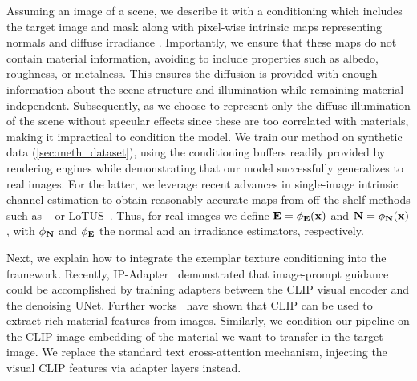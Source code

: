 Assuming an image \target of a scene, we describe it with a conditioning \xx which includes the target image and mask along with pixel-wise intrinsic maps representing normals \normal %
and diffuse irradiance \irra%
. Importantly, we ensure that these maps do not contain material information, avoiding to include properties such as albedo, roughness, or metalness. This ensures the diffusion is provided with enough information about the scene structure and illumination while remaining material-independent. Subsequently, as \irra we choose to represent only the diffuse illumination of the scene without specular effects since these are too correlated with materials, making it impractical to condition the model. 
We train our method on synthetic data (\cref{sec:meth_dataset}), using the conditioning buffers readily provided by rendering engines while demonstrating that our model successfully generalizes to real images. 
For the latter, we leverage recent advances in single-image intrinsic channel estimation to obtain reasonably accurate maps from off-the-shelf methods such as \rgbtooxx~\cite{zeng2024rgbx} or LoTUS~\cite{he2024lotus}. Thus, for real images we define $\mathbf{E}=\phi_\mathbf{E}(\mathbf{x})$ and $ \mathbf{N}=\phi_\mathbf{N}(\mathbf{x})$, with $\phi_\mathbf{N}$ and $\phi_\mathbf{E}$ the normal and an irradiance estimators, respectively.

Next, we explain how to integrate the exemplar texture conditioning into the framework. 
Recently, IP-Adapter~\cite{ye2023ipadapter} demonstrated that image-prompt guidance could be accomplished by training adapters between the CLIP \cite{radford2021learning} visual encoder and the denoising UNet. Further works~\cite{vecchio2024controlmat,cheng2024zest,Yan:2023:PSDR-Room,guerrero2024texsliders} have shown that CLIP can be used to extract rich material features from images. 
Similarly, we condition our pipeline on the CLIP image embedding of the material we want to transfer in the target image. We replace the standard text cross-attention mechanism, injecting the visual CLIP features via adapter layers instead.




